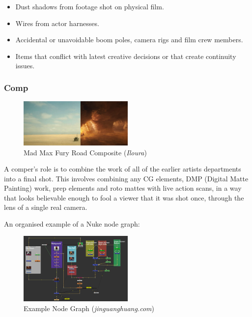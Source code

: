 \begin{itemize}
\tightlist
\item
  Dust shadows from footage shot on physical film.
\item
  Wires from actor harnesses.
\item
  Accidental or unavoidable boom poles, camera rigs and film crew members.
\item
  Items that conflict with latest creative decisions or that create continuity issues.
\end{itemize}

\hypertarget{comp}{%
\subsubsection{Comp}\label{comp}}

\begin{figure}
\includegraphics[width=0.5\textwidth,height=\textheight]{./images/mad_max_fx.png}
\caption{Mad Max Fury Road Composite (\emph{Iloura})}
\end{figure}

A comper's role is to combine the work of all of the earlier artists departments into a final shot. This involves combining any CG elements, DMP (Digital Matte Painting) work, prep elements and roto mattes with live action scans, in a way that looks believable enough to fool a viewer that it was shot once, through the lens of a single real camera.

An organised example of a Nuke node graph:

\begin{figure}
\includegraphics[width=0.5\textwidth,height=\textheight]{./images/nuke_node_graph.png}
\caption{Example Node Graph (\emph{jinguanghuang.com})}
\end{figure}

